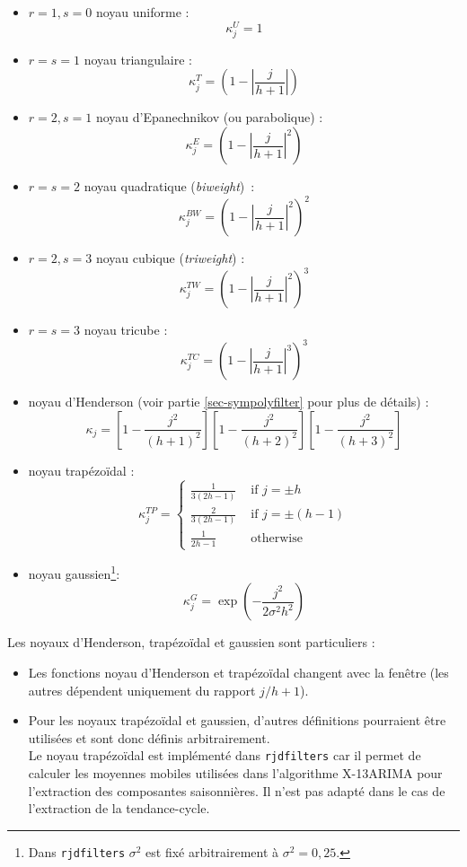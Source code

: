 \documentclass[
  12pt,
  a4paper,french]{article}
\newcommand\1{\mathds{1}}
\begin{document}
\begin{multicols}{2}

\begin{itemize}
\item
  \(r=1,s=0\) noyau uniforme :
  \[\kappa_j^U=1\]
\item
  \(r=s=1\) noyau triangulaire :
  \[\kappa_j^T=\left(
  1-
  \left\lvert
  \frac j {h+1}
  \right\lvert
  \right)\]
\item
  \(r=2,s=1\) noyau d'Epanechnikov (ou parabolique) :
  \[\kappa_j^E=\left(
  1-
  \left\lvert
  \frac j {h+1}
  \right\lvert^2
  \right)\]
\item
  \(r=s=2\) noyau quadratique (\emph{biweight})~:
  \[\kappa_j^{BW}=\left(
  1-
  \left\lvert
  \frac j {h+1}
  \right\lvert^2
  \right)^2\]
\item
  \(r = 2, s = 3\) noyau cubique (\emph{triweight}) :
  \[\kappa_j^{TW}=\left(
  1-
  \left\lvert
  \frac j {h+1}
  \right\lvert^2
  \right)^3\]
\item
  \(r = s = 3\) noyau tricube :
  \[\kappa_j^{TC}=\left(
  1-
  \left\lvert
  \frac j {h+1}
  \right\lvert^3
  \right)^3\]
\item
  noyau d'Henderson (voir partie \ref{sec-sympolyfilter} pour plus de détails) :
  \[
  \kappa_{j}=\left[1-\frac{j^2}{(h+1)^2}\right]
  \left[1-\frac{j^2}{(h+2)^2}\right]
  \left[1-\frac{j^2}{(h+3)^2}\right]
  \]
\item
  noyau trapézoïdal :
  \[
  \kappa_j^{TP}=
  \begin{cases}
  \frac{1}{3(2h-1)} & \text{ if }j=\pm h 
  \\
  \frac{2}{3(2h-1)} & \text{ if }j=\pm (h-1)\\
  \frac{1}{2h-1}& \text{ otherwise}
  \end{cases}
  \]
\item
  noyau gaussien\footnote{
    Dans \texttt{rjdfilters} \(\sigma^2\) est fixé arbitrairement à \(\sigma^2=0,25\).}:
  \[
  \kappa_j^G=\exp\left(
  -\frac{
  j^2
  }{
  2\sigma^2h^2
  }\right)
  \]
\end{itemize}

\end{multicols}

Les noyaux d'Henderson, trapézoïdal et gaussien sont particuliers :

\begin{itemize}
\item
  Les fonctions noyau d'Henderson et trapézoïdal changent avec la fenêtre (les autres dépendent uniquement du rapport \(j/h+1\)).
\item
  Pour les noyaux trapézoïdal et gaussien, d'autres définitions pourraient être utilisées et sont donc définis arbitrairement.\\
  Le noyau trapézoïdal est implémenté dans \texttt{rjdfilters} car il permet de calculer les moyennes mobiles utilisées dans l'algorithme X-13ARIMA pour l'extraction des composantes saisonnières.
  Il n'est pas adapté dans le cas de l'extraction de la tendance-cycle.
\end{itemize}
\end{document}
